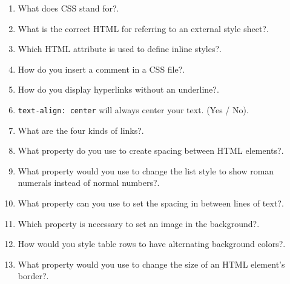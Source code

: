 \documentclass[11pt,a4paper]{article}
\begin{document}
\begin{enumerate}
\item What does CSS stand for?\underline{\hspace{3cm}}.

\item What is the correct HTML for referring to an external style sheet?\underline{\hspace{3cm}}.

\item Which HTML attribute is used to define inline styles?\underline{\hspace{3cm}}.

\item How do you insert a comment in a CSS file?\underline{\hspace{3cm}}.

\item How do you display hyperlinks without an underline?\underline{\hspace{3cm}}.

\item \texttt{text-align: center} will always center your text. (Yes / No)\underline{\hspace{3cm}}.

\item What are the four kinds of links?\underline{\hspace{3cm}}.

\item What property do you use to create spacing between HTML elements?\underline{\hspace{3cm}}.

\item What property would you use to change the list style to show roman numerals instead of normal numbers?\underline{\hspace{3cm}}.

\item What property can you use to set the spacing in between lines of text?\underline{\hspace{3cm}}.

\item Which property is necessary to set an image in the background?\underline{\hspace{3cm}}.

\item How would you style table rows to have alternating background colors?\underline{\hspace{3cm}}.

\item What property would you use to change the size of an HTML element's border?\underline{\hspace{3cm}}.


\end{enumerate}
\end{document}

